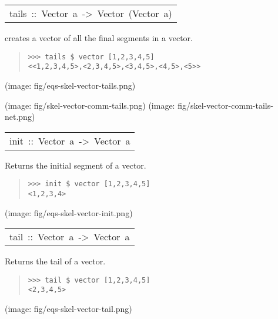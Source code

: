 \begin{haddockdesc}
\item[\begin{tabular}{@{}l}
tails\ ::\ Vector\ a\ ->\ Vector\ (Vector\ a)
\end{tabular}]\haddockbegindoc
creates a vector of all the final segments in a vector.\par
\begin{quote}
{\haddockverb\begin{verbatim}
>>> tails $ vector [1,2,3,4,5]
<<1,2,3,4,5>,<2,3,4,5>,<3,4,5>,<4,5>,<5>>

\end{verbatim}}
\end{quote}(image: fig/eqs-skel-vector-tails.png)\par
           (image: fig/skel-vector-comm-tails.png)
 (image: fig/skel-vector-comm-tails-net.png)\par
           
\end{haddockdesc}
\begin{haddockdesc}
\item[\begin{tabular}{@{}l}
init\ ::\ Vector\ a\ ->\ Vector\ a
\end{tabular}]\haddockbegindoc
Returns the initial segment of a vector.\par
\begin{quote}
{\haddockverb\begin{verbatim}
>>> init $ vector [1,2,3,4,5]
<1,2,3,4>

\end{verbatim}}
\end{quote}(image: fig/eqs-skel-vector-init.png)\par
           
\end{haddockdesc}
\begin{haddockdesc}
\item[\begin{tabular}{@{}l}
tail\ ::\ Vector\ a\ ->\ Vector\ a
\end{tabular}]\haddockbegindoc
Returns the tail of a vector.\par
\begin{quote}
{\haddockverb\begin{verbatim}
>>> tail $ vector [1,2,3,4,5]
<2,3,4,5>

\end{verbatim}}
\end{quote}(image: fig/eqs-skel-vector-tail.png)\par
           
\end{haddockdesc}
